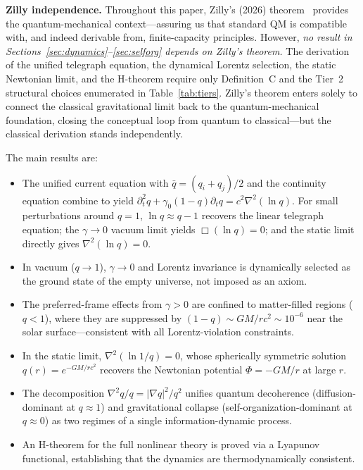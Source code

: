 \documentclass[aps,prd,twocolumn,showpacs,superscriptaddress,preprintnumbers]{revtex4-2}
\begin{document}
\textbf{Zilly independence.} Throughout this paper, Zilly's (2026) theorem~\cite{Zilly:2026} provides the quantum-mechanical context---assuring us that standard QM is compatible with, and indeed derivable from, finite-capacity principles.
However, \emph{no result in Sections~\ref{sec:dynamics}--\ref{sec:selforg} depends on Zilly's theorem.}
The derivation of the unified telegraph equation, the dynamical Lorentz selection, the static Newtonian limit, and the H-theorem require only Definition~C and the Tier~2 structural choices enumerated in Table~\ref{tab:tiers}.
Zilly's theorem enters solely to connect the classical gravitational limit back to the quantum-mechanical foundation, closing the conceptual loop from quantum to classical---but the classical derivation stands independently.

The main results are:

\begin{itemize}
    \item The unified current equation with $\bar{q}=(q_i+q_j)/2$ and the continuity equation combine to yield $\partial_t^2 q + \gamma_0(1-q)\partial_t q = c^2\nabla^2(\ln q)$. For small perturbations around $q=1$, $\ln q\approx q-1$ recovers the linear telegraph equation; the $\gamma\to0$ vacuum limit yields $\Box(\ln q)=0$; and the static limit directly gives $\nabla^2(\ln q)=0$.
    \item In vacuum ($q\to1$), $\gamma\to0$ and Lorentz invariance is dynamically selected as the ground state of the empty universe, not imposed as an axiom.
    \item The preferred-frame effects from $\gamma>0$ are confined to matter-filled regions ($q<1$), where they are suppressed by $(1-q)\sim GM/rc^2\sim10^{-6}$ near the solar surface---consistent with all Lorentz-violation constraints.
    \item In the static limit, $\nabla^2(\ln 1/q)=0$, whose spherically symmetric solution $q(r)=e^{-GM/rc^2}$ recovers the Newtonian potential $\Phi=-GM/r$ at large $r$.
    \item The decomposition $\nabla^2 q/q = |\nabla q|^2/q^2$ unifies quantum decoherence (diffusion-dominant at $q\approx1$) and gravitational collapse (self-organization-dominant at $q\approx0$) as two regimes of a single information-dynamic process.
    \item An H-theorem for the full nonlinear theory is proved via a Lyapunov functional, establishing that the dynamics are thermodynamically consistent.
\end{itemize}
\end{document}

